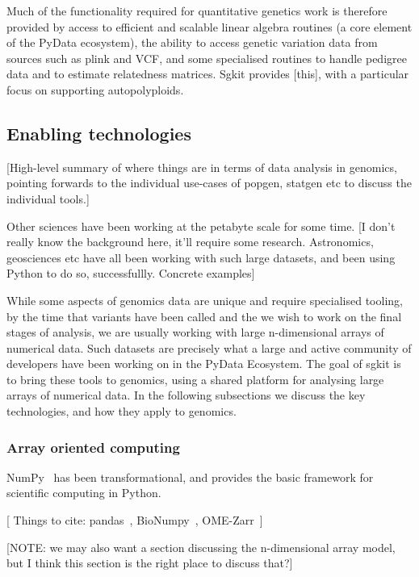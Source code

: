 \documentclass[9pt,lineno]{elife}
\begin{document}
Much of the functionality required for quantitative genetics work
is therefore provided by access to efficient and scalable linear algebra
routines (a core element of the PyData ecosystem), the ability
to access genetic variation data from sources such as plink and VCF,
and some specialised routines to handle pedigree data and to
estimate relatedness matrices. Sgkit provides [this], with a particular
focus on supporting autopolyploids.




\subsection{Enabling technologies}

[High-level summary of where things are in terms of data analysis
in genomics, pointing forwards to
the individual use-cases of popgen, statgen etc to discuss the
individual tools.]

Other sciences have been working at the petabyte scale for some time.
[I don't really know the background here, it'll require some research.
Astronomics, geosciences etc have all been working with such large
datasets, and been using Python to do so, successfullly. Concrete
examples]

While some aspects of genomics data are unique and require specialised
tooling, by the time that variants have been called and the we wish
to work on the final stages of analysis, we are usually
working with large n-dimensional arrays of numerical data. Such
datasets are precisely what a large and active community of
developers have been working on in the PyData Ecosystem. The goal
of sgkit is to bring these tools to genomics, using a
shared platform for analysing large arrays of numerical data. In the
following subsections we discuss the key technologies, and how
they apply to genomics.

\subsubsection{Array oriented computing}

NumPy~\citep{harris2020array} has been transformational, and provides
the basic framework for scientific computing in Python.

[ Things to cite: pandas~\citep{mckinney2010data},
BioNumpy~\citep{rand2022bionumpy}, OME-Zarr~\citep{moore2023ome}]

[NOTE: we may also want a section discussing the n-dimensional array model,
but I think this section is the right place to discuss that?]
\end{document}
